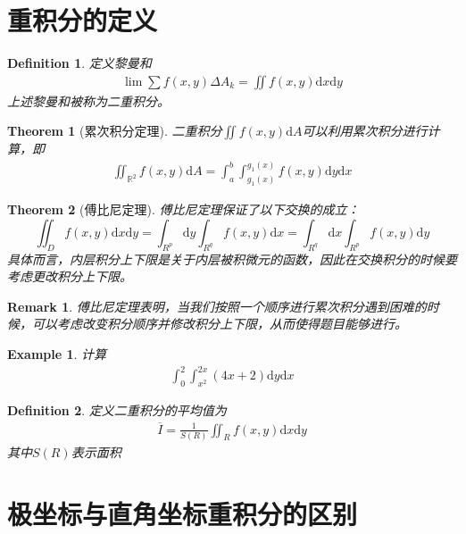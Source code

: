 \documentclass[12pt,a4paper,UTF8]{ctexbook}
\theoremstyle{plain}
\newtheorem{theorem}{\indent Theorem}[section]
\newtheorem{definition}{\indent Definition}[section]
\newtheorem{example}{\indent Example}[section]
\newtheorem{remark}{\indent Remark}[section]
\begin{document}
\section{重积分的定义}
\begin{definition}
    定义黎曼和
    \begin{align*} 
        \lim \sum f(x,y)\Delta A_k = \iint f(x,y)\mathrm d x\mathrm d y
    \end{align*} 
    上述黎曼和被称为二重积分。
\end{definition}
\begin{theorem}[累次积分定理]
    二重积分$\iint f(x,y)\mathrm d A$可以利用累次积分进行计算，即
    \begin{align*} 
        \iint_{\mathbb R^{2}} f(x,y) \mathrm d A = \int_{a}^b\int_{g_1(x)}^{g_1(x)}f(x,y)\mathrm d y\mathrm d x
    \end{align*} 
\end{theorem}
\begin{theorem}[傅比尼定理]
傅比尼定理保证了以下交换的成立：
\begin{equation}
    \iint_{D} f(x,y)\mathrm d x\mathrm d y=\int_{R^{p}}\mathrm d y \int_{R^q}f(x,y)\mathrm d x=\int_{R^{q}}\mathrm d x \int_{R^p}f(x,y)\mathrm d y
\end{equation}
具体而言，内层积分上下限是关于内层被积微元的函数，因此在交换积分的时候要考虑更改积分上下限。
\end{theorem}
\begin{remark}
傅比尼定理表明，当我们按照一个顺序进行累次积分遇到困难的时候，可以考虑改变积分顺序并修改积分上下限，从而使得题目能够进行。
\end{remark}
\begin{example}
    计算 
    \begin{align*} 
    \int_0^2 \int_{x^2}^{2x} (4x+2)\mathrm d y \mathrm d x
    \end{align*} 
\end{example}
\begin{definition}
定义二重积分的平均值为
\begin{align*} 
\overline{I}=\frac{1}{S(R)}\iint_R f(x,y)\mathrm d x\mathrm d y
\end{align*} 
其中$S(R)$表示面积
\end{definition}

\section{极坐标与直角坐标重积分的区别}
\end{document}
